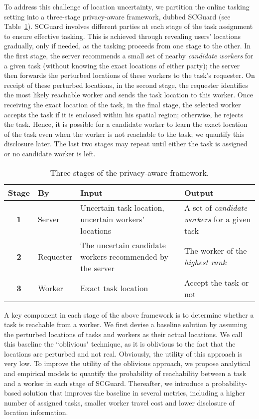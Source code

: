 \documentclass{USC-Thesis}
\numberwithin{equation}{chapter}
\begin{document}
To address this challenge of location uncertainty, we partition the online tasking setting into a three-stage privacy-aware framework, dubbed SCGuard (see Table~\ref{tab:stages}). SCGuard involves different parties at each stage of the task assignment to ensure effective tasking. This is achieved through revealing users' locations gradually, only if needed, as the tasking proceeds from one stage to the other. In the first stage, the server recommends a small set of nearby \emph{candidate workers} for a given task (without knowing the exact locations of either party); the server then forwards the perturbed locations of these workers to the task's requester. On receipt of these perturbed locations, in the second stage, the requester identifies the most likely reachable worker and sends the task location to this worker. Once receiving the exact location of the task, in the final stage, the selected worker accepts the task if it is enclosed within his spatial region; otherwise, he rejects the task. Hence, it is possible for a candidate worker to learn the exact location of the task even when the worker is not reachable to the task; we quantify this disclosure later. The last two stages may repeat until either the task is assigned or no candidate worker is left.

\begin{table}[ht]
\begin{center}
\footnotesize
\begin{tabular}{ | c | l | m{12.5em} | m{10em} | } 
\hline
\textbf{Stage}					& \textbf{By} & \textbf{Input} 				& \textbf{Output} \\
\hline
\textbf{1} 	& Server	&  Uncertain task location, uncertain workers' locations			&  A set of \emph{candidate workers} for a given task \\ 
\hline
\textbf{2}	& Requester & The uncertain candidate workers recommended by the server & The worker of the \emph{highest rank} \\  
\hline
\textbf{3} 	& Worker	&  Exact task location			& Accept the task or not \\ 
\hline
\end{tabular}
\caption{Three stages of the privacy-aware framework.}
\label{tab:stages}
\end{center}
\end{table}

A key component in each stage of the above framework is to determine whether a task is reachable from a worker. We first devise a baseline solution by assuming the perturbed locations of tasks and workers as their actual locations. We call this baseline the ``oblivious" technique, as it is oblivious to the fact that the locations are perturbed and not real. Obviously, the utility of this approach is very low. To improve the utility of the oblivious approach, we propose analytical and empirical models to quantify the probability of reachability between a task and a worker in each stage of SCGuard. Thereafter, we introduce a probability-based solution that improves the baseline in several metrics, including a higher number of assigned tasks, smaller worker travel cost and lower disclosure of location information. 
\end{document}

